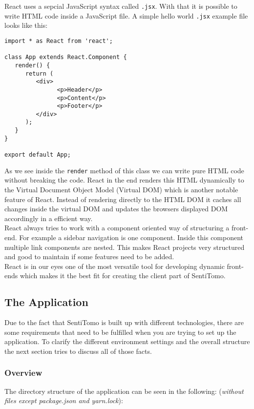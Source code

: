 \documentclass[]{article}
\begin{document}
React uses a sepcial JavaScript syntax called \texttt{.jsx}. With that
it is possible to write HTML code inside a JavaScript file. A simple
hello world \texttt{.jsx} example file looks like this:

\begin{verbatim}
import * as React from 'react';

class App extends React.Component {
   render() {
      return (
         <div>
               <p>Header</p>
               <p>Content</p>
               <p>Footer</p>
         </div>
      );
   }
}

export default App;
\end{verbatim}

As we see inside the \texttt{render} method of this class we can write
pure HTML code without breaking the code. React in the end renders this
HTML dynamically to the Virtual Document Object Model (Virtual DOM)
which is another notable feature of React. Instead of rendering directly
to the HTML DOM it caches all changes inside the virtual DOM and updates
the browsers displayed DOM accordingly in a efficient way.\\
React always tries to work with a component oriented way of structuring
a front-end. For example a sidebar navigation is one component. Inside
this component multiple link components are nested. This makes React
projects very structured and good to maintain if some features need to
be added.\\
React is in our eyes one of the most versatile tool for developing
dynamic front-ends which makes it the best fit for creating the client
part of SentiTomo.

\subsection{The Application}\label{the-application}

Due to the fact that SentiTomo is built up with different technologies,
there are some requirements that need to be fulfilled when you are
trying to set up the application. To clarify the different environment
settings and the overall structure the next section tries to discuss all
of those facts.

\subsubsection{Overview}\label{overview}

The directory structure of the application can be seen in the following:
(\emph{without files except package.json and yarn.lock}):
\end{document}
